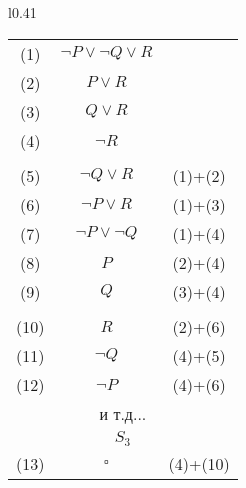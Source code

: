 \documentclass[18pt, a4paper]{extarticle}
\begin{document}
\begin{wrapfigure}[19]{l}{0.41\textwidth}
\begin{tabular}{|c|c|c|}
\hline
\rowcolor[HTML]{34CDF9} 
\multicolumn{3}{|c|}{\cellcolor[HTML]{34CDF9}$S_0$}                       \\ \hline
\cellcolor[HTML]{FE0000}(1)  & $\lnot P \vee \lnot Q \vee R$ &            \\ \hline
\cellcolor[HTML]{34CDF9}(2)  & $ P \vee R$                   &            \\ \hline
\cellcolor[HTML]{34CDF9}(3)  & $Q \vee R$                    &            \\ \hline
\cellcolor[HTML]{FE0000}(4)  & $\lnot R$                     &            \\ \hline
\rowcolor[HTML]{34CDF9} 
\multicolumn{3}{|c|}{\cellcolor[HTML]{34CDF9}$S_1$}                       \\ \hline
\cellcolor[HTML]{FE0000}(5)  & $\lnot Q \vee R$              & (1)+(2)  \\ \hline
\cellcolor[HTML]{FE0000}(6)  & $\lnot P \vee R$              & (1)+(3)  \\ \hline
\rowcolor[HTML]{9B9B9B} 
(7)                          & $\lnot P \vee \lnot Q$        & (1)+(4)  \\ \hline
\rowcolor[HTML]{C0C0C0} 
(8)                          & $P$                           & (2)+(4)  \\ \hline
\rowcolor[HTML]{C0C0C0} 
(9)                          & $Q$                           & (3)+(4)  \\ \hline
\rowcolor[HTML]{34CDF9} 
\multicolumn{3}{|c|}{\cellcolor[HTML]{34CDF9}$S_2$}                       \\ \hline
\cellcolor[HTML]{34CDF9}(10) & $R$                           & (2)+(6)  \\ \hline
\rowcolor[HTML]{9B9B9B} 
(11)                         & $\lnot Q$                     & (4)+(5)  \\ \hline
\rowcolor[HTML]{9B9B9B} 
(12)                         & $\lnot P$                     & (4)+(6)  \\ \hline
\multicolumn{3}{|c|}{\cellcolor[HTML]{9B9B9B}и т.д...}                                          \\ \hline
\multicolumn{3}{|c|}{\cellcolor[HTML]{34CDF9}$S_3$}                       \\ \hline
\cellcolor[HTML]{34CDF9}(13) & $\square$                     & (4)+(10) \\ \hline
\end{tabular}
\end{wrapfigure}
\end{document}
